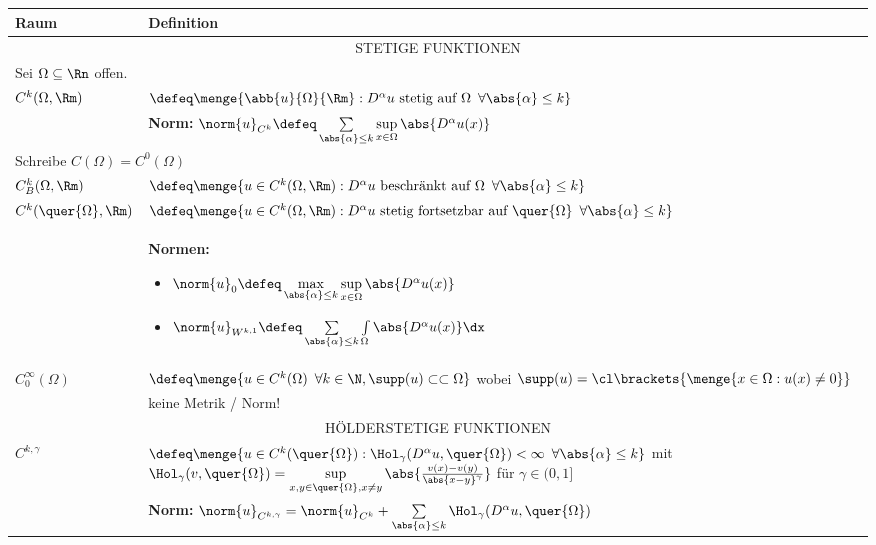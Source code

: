 \documentclass[ngerman, 11pt]{article}
\begin{document}
	\begin{tabular}{p{2cm} p{13cm}}
		\hline
		Raum & Definition \\ \hline\hline
		\multicolumn{2}{c}{\MakeUppercase{Stetige Funktionen}} \\ \hline
		\multicolumn{2}{l}{Sei $\Omega \subseteq \Rn$ offen.} \\ 
		$C^k(\Omega, \Rm)$ & $\defeq \menge{\abb{u}{\Omega}{\Rm}: D^\alpha u \text{ stetig auf } \Omega \enskip \forall \abs{\alpha} \le k}$ \\
		& \textbf{Norm:} $\norm{u}_{C^k} \defeq \sum\limits_{\abs{\alpha} \le k} \sup\limits_{x \in \Omega} \abs{D^\alpha u(x)}$ \\
		\multicolumn{2}{l}{Schreibe $C(\Omega) = C^0(\Omega)$} \\
		$C^k_B(\Omega, \Rm)$ & $\defeq \menge{u \in C^k(\Omega, \Rm): D^\alpha u \text{ beschränkt auf } \Omega \enskip \forall \abs{\alpha} \le k}$ \\
		$C^k(\quer{\Omega}, \Rm)$ & $\defeq \menge{u \in C^k(\Omega, \Rm): D^\alpha u \text{ stetig fortsetzbar auf } \quer{\Omega} \enskip \forall \abs{\alpha} \le k}$ \\ 
		& \textbf{Normen:}
		\begin{itemize}
			\item $\norm{u}_0 \defeq \max\limits_{\abs{\alpha} \le k} \sup\limits_{x \in \Omega} \abs{D^\alpha u(x)}$
			\item $\norm{u}_{W^{k,1}} \defeq \sum\limits_{\abs{\alpha} \le k} \int\limits_{\Omega} \abs{D^\alpha u(x)} \dx$
		\end{itemize} \\
		$C_0^\infty(\Omega)$ & $\defeq \menge{u \in C^k(\Omega) \enskip \forall k \in \N, \supp(u) \subset\subset \Omega}$ wobei $\supp(u) = \cl\brackets{\menge{x \in \Omega : u(x) \neq 0}}$ \\
		& keine Metrik / Norm! \\ \hline
		\multicolumn{2}{c}{\MakeUppercase{Hölderstetige Funktionen}} \\ \hline
		$C^{k,\gamma}$ & $\defeq \menge{u \in C^k(\quer{\Omega}) : \Hol_\gamma(D^\alpha u, \quer{\Omega}) < \infty \enskip \forall \abs{\alpha} \le k}$ mit $\Hol_\gamma(v,\quer{\Omega}) = \sup\limits_{x,y \in \quer{\Omega}, x \neq y} \abs{\frac{v(x)-v(y)}{\abs{x-y}^\gamma}}$ für $\gamma\in (0,1]$ \\
		& \textbf{Norm:} $\norm{u}_{C^{k,\gamma}} = \norm{u}_{C^k} + \sum\limits_{\abs{\alpha} \le k} \Hol_\gamma(D^\alpha u, \quer{\Omega})$ \\ \hline

\end{tabular}
\end{document}
